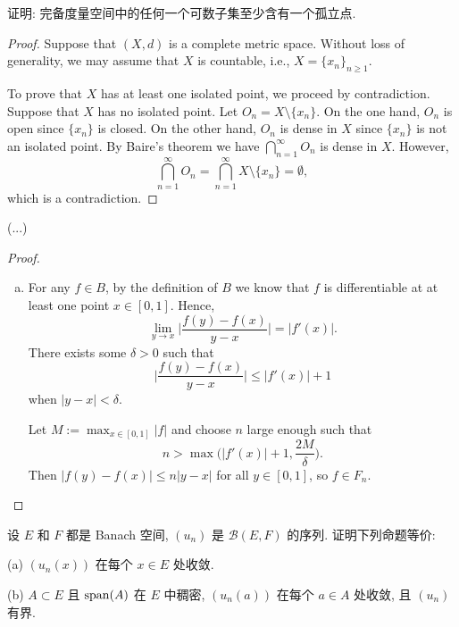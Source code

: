 \begin{exercise}
    证明: 完备度量空间中的任何一个可数子集至少含有一个孤立点.
\end{exercise}

\begin{proof}
  Suppose that $(X,d)$ is a complete metric space.
  Without loss of generality, we may assume that $X$ is countable, i.e., $X = \{x_n\}_{n\geq 1}$.

  To prove that $X$ has at least one isolated point, we proceed by contradiction.
  Suppose that $X$ has no isolated point. Let $O_n = X\setminus \{x_n\}$.
  On the one hand, $O_n$ is open since $\{x_n\}$ is closed.
  On the other hand, $O_n$ is dense in $X$ since $\{x_n\}$ is not an isolated point.
  By Baire's theorem we have
  $\bigcap_{n=1}^\infty O_n$ is dense in $X$.
  However,
  \[\bigcap_{n=1}^\infty O_n = \bigcap_{n=1}^\infty X\setminus\{x_n\} = \emptyset,\]
  which is a contradiction.
\end{proof}


\begin{exercise}
  (...)
\end{exercise}

\begin{proof}
  \begin{enumerate}[(a)]
    \item For any $f\in B$, by the definition of $B$ we know that $f$ is differentiable
      at at least one point $x\in [0,1]$. Hence,
      \[\lim_{y\to x} \biggl|\frac{f(y)-f(x)}{y-x}\biggr| = |f'(x)|.\]
      There exists some $\delta>0$ such that
      \[\biggl|\frac{f(y)-f(x)}{y-x}\biggr| \leq |f'(x)| + 1\]
      when $|y - x| < \delta$.

      Let $M := \max_{x\in [0,1]} |f|$ and choose $n$ large enough such that
      \[n > \max\biggl(|f'(x)|+1, \frac{2M}{\delta}\biggr).\]
      Then $|f(y)-f(x)| \leq n |y-x|$ for all $y\in [0,1]$, so $f\in F_n$.
  \end{enumerate}
\end{proof}


\begin{exercise}[6]
    设 $E$ 和 $F$ 都是 Banach 空间, $(u_n)$ 是 $\mathcal{B}(E,F)$ 的序列.
    证明下列命题等价:

    (a) $(u_n(x))$ 在每个 $x\in E$ 处收敛.

    (b) $A\subset E$ 且 $\operatorname{span}(A)$ 在 $E$ 中稠密, $(u_n(a))$ 在每个 $a\in A$ 处收敛,
    且 $(u_n)$ 有界.
\end{exercise}

